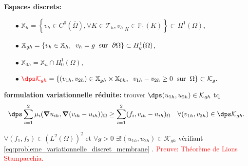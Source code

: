 \documentclass{beamer}
\begin{document}
\begin{frame}
\textbf{Espaces discrets:}
\begin{itemize}
\item[$\bullet$]${\mathbb{X}}_h=\left\{v_h \in C^0(\overline{\Omega}), \forall K \in {\mathcal{T}}_h, {v_h}_{|K} \in {\mathbb{P}}_1 (K)\right\} \subset H^1(\Omega)$,
\item[$\bullet$]${\mathbb{X}}_{gh}=\left\{v_h \in {\mathbb{X}}_h, \hspace{0.2 cm} v_h=g \hspace{0.2 cm} \mbox{sur} \hspace{0.2 cm} \partial \Omega\right\}\subset H_g^1(\Omega)$,
\item[$\bullet$]${\mathbb{X}}_{0h}={\mathbb{X}}_h \cap H_0^1(\Omega)$,
\item[$\bullet$]$\textcolor{red}{\dps \mathcal{K}_{gh}}=\left\{(v_{1h},v_{2h}) \in {\mathbb {X}}_{gh} \times {\mathbb{X}}_{0h}, \hspace{0.2 cm} v_{1h}-v_{2h} \geq 0 \hspace{0.2 cm} \mbox{sur} \hspace{0.2 cm} \Omega\right\} \subset \mathcal{K}_{g}.$
\end{itemize}
\begin{definition}
\textbf{formulation variationnelle réduite:} trouver $\dps (u_{1h},u_{2h}) \in \mathcal{K}_{gh}$ tq \begin{equation}
\dps \sum_{i=1}^2 \mu_i ({\bm \nabla} u_{ih}, {\bm \nabla} (v_{ih}-u_{ih}))_{\Omega} \geq \sum_{i=1}^2 (f_i,v_{ih}-u_{ih})_{\Omega} \quad \forall ( v_{1h},v_{2h}) \in  \dps \mathcal{K}_{gh}
\label{eq:probleme_variationnelle_discret_membrane}
.\end{equation}
\end{definition}
\begin{proposition}
$\forall (f_1,f_2) \in (L^2(\Omega))^2$ et $\forall g>0$ $\exists ! (u_{1h},u_{2h}) \in  \displaystyle \mathcal{K}_{gh}$ vérifiant \eqref{eq:probleme_variationnelle_discret_membrane}
.
\textcolor{red}{Preuve: Théorème de Lions Stampacchia.}
\end{proposition}
\end{frame}
\end{document}
